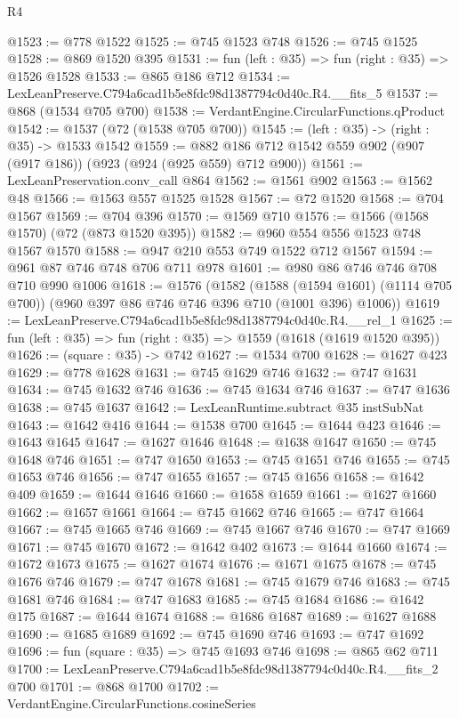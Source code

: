 \begin{lexlean}{R4}
\begin{coremodule}
@1523 := @778 @1522
@1525 := @745 @1523 @748
@1526 := @745 @1525
@1528 := @869 @1520 @395
@1531 := fun (left : @35) => fun (right : @35) => @1526 @1528
@1533 := @865 @186 @712
@1534 := LexLeanPreserve.C794a6cad1b5e8fdc98d1387794c0d40c.R4.__fits_5
@1537 := @868 (@1534 @705 @700)
@1538 := VerdantEngine.CircularFunctions.qProduct
@1542 := @1537 (@72 (@1538 @705 @700))
@1545 := (left : @35) -> (right : @35) -> @1533 @1542
@1559 := @882 @186 @712 @1542 @559 @902 (@907 (@917 @186)) (@923 (@924 (@925 @559) @712 @900))
@1561 := LexLeanPreservation.conv_call @864
@1562 := @1561 @902
@1563 := @1562 @48
@1566 := @1563 @557 @1525 @1528
@1567 := @72 @1520
@1568 := @704 @1567
@1569 := @704 @396
@1570 := @1569 @710
@1576 := @1566 (@1568 @1570) (@72 (@873 @1520 @395))
@1582 := @960 @554 @556 @1523 @748 @1567 @1570
@1588 := @947 @210 @553 @749 @1522 @712 @1567
@1594 := @961 @87 @746 @748 @706 @711 @978
@1601 := @980 @86 @746 @746 @708 @710 @990 @1006
@1618 := @1576
    (@1582
      (@1588 (@1594 @1601) (@1114 @705 @700))
      (@960 @397 @86 @746 @746 @396 @710 (@1001 @396) @1006))
@1619 := LexLeanPreserve.C794a6cad1b5e8fdc98d1387794c0d40c.R4.__rel_1
@1625 := fun (left : @35) => fun (right : @35) => @1559 (@1618 (@1619 @1520 @395))
@1626 := (square : @35) -> @742
@1627 := @1534 @700
@1628 := @1627 @423
@1629 := @778 @1628
@1631 := @745 @1629 @746
@1632 := @747 @1631
@1634 := @745 @1632 @746
@1636 := @745 @1634 @746
@1637 := @747 @1636
@1638 := @745 @1637
@1642 := LexLeanRuntime.subtract @35 instSubNat
@1643 := @1642 @416
@1644 := @1538 @700
@1645 := @1644 @423
@1646 := @1643 @1645
@1647 := @1627 @1646
@1648 := @1638 @1647
@1650 := @745 @1648 @746
@1651 := @747 @1650
@1653 := @745 @1651 @746
@1655 := @745 @1653 @746
@1656 := @747 @1655
@1657 := @745 @1656
@1658 := @1642 @409
@1659 := @1644 @1646
@1660 := @1658 @1659
@1661 := @1627 @1660
@1662 := @1657 @1661
@1664 := @745 @1662 @746
@1665 := @747 @1664
@1667 := @745 @1665 @746
@1669 := @745 @1667 @746
@1670 := @747 @1669
@1671 := @745 @1670
@1672 := @1642 @402
@1673 := @1644 @1660
@1674 := @1672 @1673
@1675 := @1627 @1674
@1676 := @1671 @1675
@1678 := @745 @1676 @746
@1679 := @747 @1678
@1681 := @745 @1679 @746
@1683 := @745 @1681 @746
@1684 := @747 @1683
@1685 := @745 @1684
@1686 := @1642 @175
@1687 := @1644 @1674
@1688 := @1686 @1687
@1689 := @1627 @1688
@1690 := @1685 @1689
@1692 := @745 @1690 @746
@1693 := @747 @1692
@1696 := fun (square : @35) => @745 @1693 @746
@1698 := @865 @62 @711
@1700 := LexLeanPreserve.C794a6cad1b5e8fdc98d1387794c0d40c.R4.__fits_2 @700
@1701 := @868 @1700
@1702 := VerdantEngine.CircularFunctions.cosineSeries

\end{coremodule}
\end{lexlean}
